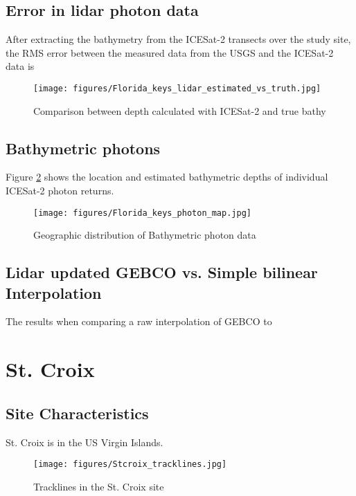 \subsection{Error in lidar photon data}
After extracting the bathymetry from the ICESat-2 transects over the study site, the RMS error between the measured data from the USGS and the ICESat-2 data is
\begin{figure}[h!]
    \centering
    \texttt{[image: figures/Florida\_keys\_lidar\_estimated\_vs\_truth.jpg]}
    \caption{Comparison between depth calculated with ICESat-2 and true bathy}
    \label{fig:fl_truth_vs_measured_points}
\end{figure}
% 

% 

\subsection{Bathymetric photons}
Figure \ref{fig:bathyphotonmap} shows the location and estimated bathymetric depths of individual ICESat-2 photon returns.
\begin{figure}[h!]
    \centering
    \texttt{[image: figures/Florida\_keys\_photon\_map.jpg]}
    \caption{Geographic distribution of Bathymetric photon data}
    \label{fig:bathyphotonmap}
\end{figure}

\subsection{Lidar updated GEBCO vs. Simple bilinear Interpolation}
The results when comparing a raw interpolation of GEBCO to
% 



\section{St. Croix}

\subsection{Site Characteristics}

St. Croix is in the US Virgin Islands. 

\begin{figure}[h!]
    \centering
    \texttt{[image: figures/Stcroix\_tracklines.jpg]}
    \caption{Tracklines in the St. Croix site}
    \label{fig:st-croix-tracklines}
\end{figure}

